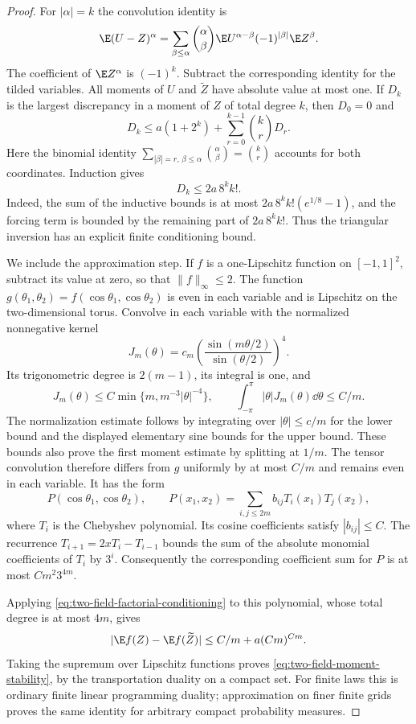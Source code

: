 \begin{proof}
For $|\alpha|=k$ the convolution identity is
\begin{equation}\label{eq:two-field-triangular-moments}
 \E(U-Z)^\alpha
   =\sum_{\beta\le\alpha}\binom{\alpha}{\beta}
        \E U^{\alpha-\beta}(-1)^{|\beta|}\E Z^\beta.
\end{equation}
The coefficient of $\E Z^\alpha$ is $(-1)^k$.  Subtract the
corresponding identity for the tilded variables.  All moments of
$U$ and $\widetilde Z$ have absolute value at most one.  If $D_k$
is the largest discrepancy in a moment of $Z$ of total degree $k$,
then $D_0=0$ and
\[
 D_k\le a(1+2^k)+\sum_{r=0}^{k-1}\binom{k}{r}D_r.
\]
Here the binomial identity
$\sum_{|\beta|=r,\,\beta\le\alpha}\binom{\alpha}{\beta}
=\binom{k}{r}$ accounts for both coordinates.  Induction gives
\begin{equation}\label{eq:two-field-factorial-conditioning}
                         D_k\le 2a\,8^k k!.
\end{equation}
Indeed, the sum of the inductive bounds is at most
$2a\,8^k k!(e^{1/8}-1)$, and the forcing term is bounded by the
remaining part of $2a\,8^k k!$.  Thus the triangular inversion has
an explicit finite conditioning bound.

We include the approximation step.  If $f$ is a one-Lipschitz
function on $[-1,1]^2$, subtract its value at zero, so that
$\|f\|_\infty\le2$.  The function
$g(\theta_1,\theta_2)=f(\cos\theta_1,\cos\theta_2)$ is even
in each variable and is Lipschitz on the two-dimensional torus.
Convolve in each variable with the normalized nonnegative kernel
\[
 J_m(\theta)=c_m
       \left(\frac{\sin(m\theta/2)}{\sin(\theta/2)}\right)^4.
\]
Its trigonometric degree is $2(m-1)$, its integral is one, and
\[
 J_m(\theta)\le C\min\{m,m^{-3}|\theta|^{-4}\},\qquad
                 \int_{-\pi}^{\pi}|\theta|J_m(\theta)\dd\theta
                         \le C/m.
\]
The normalization estimate follows by integrating over
$|\theta|\le c/m$ for the lower bound and the displayed elementary
sine bounds for the upper bound.  These bounds also prove the first
moment estimate by splitting at $1/m$.  The tensor convolution
therefore differs from $g$ uniformly by at most $C/m$ and remains
even in each variable.  It has the form
\[
 P(\cos\theta_1,\cos\theta_2),\qquad
 P(x_1,x_2)=\sum_{i,j\le2m}b_{ij}T_i(x_1)T_j(x_2),
\]
where $T_i$ is the Chebyshev polynomial.  Its cosine coefficients
satisfy $|b_{ij}|\le C$.  The recurrence
$T_{i+1}=2xT_i-T_{i-1}$ bounds the sum of the absolute monomial
coefficients of $T_i$ by $3^i$.  Consequently the corresponding
coefficient sum for $P$ is at most $Cm^2 3^{4m}$.

Applying \eqref{eq:two-field-factorial-conditioning} to this
polynomial, whose total degree is at most $4m$, gives
\[
 |\E f(Z)-\E f(\widetilde Z)|
       \le C/m+a(Cm)^{Cm}.
\]
Taking the supremum over Lipschitz functions proves
\eqref{eq:two-field-moment-stability}, by the transportation duality
on a compact set.  For finite laws this is ordinary finite linear
programming duality; approximation on finer finite grids proves the
same identity for arbitrary compact probability measures.
\end{proof}

